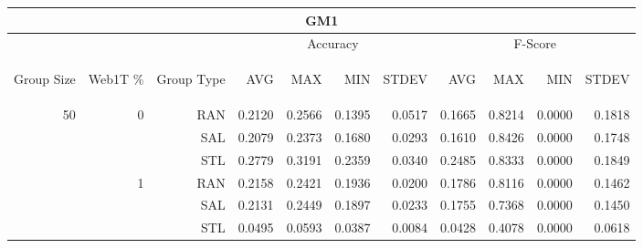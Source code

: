 \begin{center}
\begin{table}[htbp] 
 \begin{center}
\begin{tabular}{ | r | r | r | r | r | r | r | r | r | r | r |}
\hline
\multicolumn{11}{|c|}{GM1}\\
\hline
 & & & \multicolumn{4}{|c|}{Accuracy} & \multicolumn{4}{|c|}{F-Score}\\ \cline{4-11}
\begin{sideways}Group Size\end{sideways} & \begin{sideways}Web1T \%\end{sideways} & \begin{sideways}Group Type\end{sideways} & \begin{sideways}AVG\end{sideways} & \begin{sideways}MAX\end{sideways} & \begin{sideways}MIN\end{sideways} & \begin{sideways}STDEV\end{sideways} & \begin{sideways}AVG\end{sideways} & \begin{sideways}MAX\end{sideways} & \begin{sideways}MIN\end{sideways} & \begin{sideways}STDEV\end{sideways}\\
\hline
\multirow{18}{*}{50}
 & \multirow{3}{*}{0} & RAN & 0.2120 & 0.2566 & 0.1395 & 0.0517 & 0.1665 & 0.8214 & 0.0000 & 0.1818\\ \cline{3-11}
 &   & SAL & 0.2079 & 0.2373 & 0.1680 & 0.0293 & 0.1610 & 0.8426 & 0.0000 & 0.1748\\ \cline{3-11}
 &   & STL & 0.2779 & 0.3191 & 0.2359 & 0.0340 & 0.2485 & 0.8333 & 0.0000 & 0.1849\\ \cline{2-11}
 & \multirow{3}{*}{1} & RAN & 0.2158 & 0.2421 & 0.1936 & 0.0200 & 0.1786 & 0.8116 & 0.0000 & 0.1462\\ \cline{3-11}
 &   & SAL & 0.2131 & 0.2449 & 0.1897 & 0.0233 & 0.1755 & 0.7368 & 0.0000 & 0.1450\\ \cline{3-11}
 &   & STL & 0.0495 & 0.0593 & 0.0387 & 0.0084 & 0.0428 & 0.4078 & 0.0000 & 0.0618\\ \cline{2-11}

\end{tabular}
\end{center}
\end{table}
\end{center}
